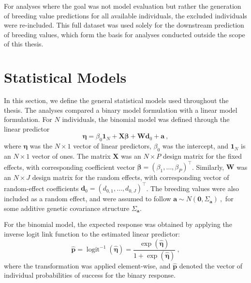 For analyses where the goal was not model evaluation but rather the generation of 
breeding value predictions for all available individuals, the excluded individuals 
were re-included. This full dataset was used solely for the downstream prediction of 
breeding values, which form the basis for analyses conducted outside the scope of 
this thesis.




\section{Statistical Models}\label{sec:stat_mod}

In this section, we define the general statistical models used throughout the thesis. 
The analyses compared a binary model formulation with a linear model formulation.
For $N$ individuals, the binomial model was defined through the linear predictor
%
\begin{equation}
\label{eq:method_bin_lin_pred}
\boldsymbol{\eta}
=
\beta_0 \mathbf{1}_N
+
\mathbf{X}\boldsymbol{\beta}
+
\mathbf{W}\mathbf{d}_0
+
\mathbf{a} \ ,
\end{equation}
%
where $\boldsymbol{\eta}$ was the $N \times 1$ vector of linear predictors, 
$\beta_0$ was the intercept, and $\mathbf{1}_N$ is an $N \times 1$ vector of ones. 
The matrix $\mathbf{X}$ was an $N \times P$ design matrix for the fixed effects, 
with corresponding coefficient vector $\boldsymbol{\beta} = (\beta_1,\ldots,\beta_P)^\top$. 
Similarly, $\mathbf{W}$ was an $N \times J$ design matrix for the random effects, 
with corresponding vector of random-effect coefficients 
$\mathbf{d}_0 = (d_{0,1},\ldots,d_{0,J})^\top$. 
The breeding values were also included as a random effect, and were assumed to follow
%
\(
\mathbf{a} \sim N(\mathbf{0}, \Sigma_{\mathbf{a}}) \ ,
\)
%
for some additive genetic covariance structure $\Sigma_{\mathbf{a}}$.

For the binomial model, the expected response was obtained by applying the inverse logit link function to the estimated linear predictor:
%
\begin{equation}
\label{eq:bin_prob}
\hat{\mathbf{p}}
=
\operatorname{logit}^{-1}(\hat{\boldsymbol{\eta}})
=
\frac{\exp(\hat{\boldsymbol{\eta}})}
{1 + \exp(\hat{\boldsymbol{\eta}})} \ ,
\end{equation}
%
where the transformation was applied element-wise, and $\hat{\mathbf{p}}$ denoted the vector of individual probabilities of success for the binary response.

